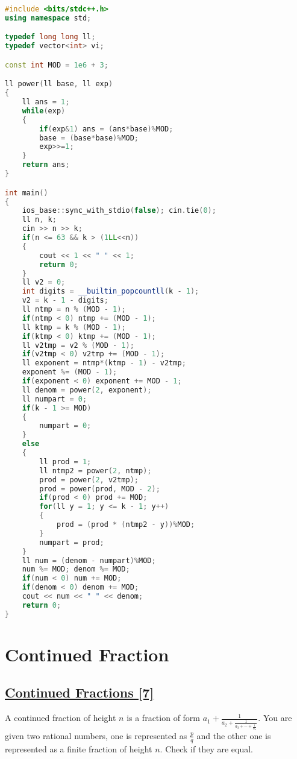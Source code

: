 \documentclass[10pt,a4paper]{article}
\begin{document}
\begin{itemize}
\begin{lstlisting}[language=C++, caption={Zeus and The Birthday Paradox},label={1st:code}, mathescape=true, breaklines=true]
#include <bits/stdc++.h>
using namespace std;

typedef long long ll;
typedef vector<int> vi;

const int MOD = 1e6 + 3;

ll power(ll base, ll exp)
{
	ll ans = 1;
    while(exp)
    {
		if(exp&1) ans = (ans*base)%MOD;
		base = (base*base)%MOD;
		exp>>=1;
	}
    return ans;
}

int main()
{
	ios_base::sync_with_stdio(false); cin.tie(0);
	ll n, k;
	cin >> n >> k;
	if(n <= 63 && k > (1LL<<n))
	{
		cout << 1 << " " << 1;
		return 0;
	}
	ll v2 = 0;
	int digits = __builtin_popcountll(k - 1);
	v2 = k - 1 - digits;
	ll ntmp = n % (MOD - 1);
	if(ntmp < 0) ntmp += (MOD - 1);
	ll ktmp = k % (MOD - 1);
	if(ktmp < 0) ktmp += (MOD - 1);
	ll v2tmp = v2 % (MOD - 1);
	if(v2tmp < 0) v2tmp += (MOD - 1);
	ll exponent = ntmp*(ktmp - 1) - v2tmp;
	exponent %= (MOD - 1);
	if(exponent < 0) exponent += MOD - 1;
	ll denom = power(2, exponent);
	ll numpart = 0;
	if(k - 1 >= MOD)
	{
		numpart = 0;
	}
	else
	{
		ll prod = 1;
		ll ntmp2 = power(2, ntmp);
		prod = power(2, v2tmp);
		prod = power(prod, MOD - 2);
		if(prod < 0) prod += MOD;
		for(ll y = 1; y <= k - 1; y++)
		{
			prod = (prod * (ntmp2 - y))%MOD;
		}
		numpart = prod;
	}
	ll num = (denom - numpart)%MOD;
	num %= MOD; denom %= MOD;
	if(num < 0) num += MOD;
	if(denom < 0) denom += MOD;
	cout << num << " " << denom;
	return 0;
}
\end{lstlisting}

\section{Continued Fraction}
\subsection*{\href{https://codeforces.com/contest/305/problem/B}{\underline{Continued Fractions [7]}}}

A continued fraction of height $n$ is a fraction of form $a_1 + \frac{1}{a_2 + \frac{1}{a_3 + \cdots + \frac{1}{a_n}}}$. You are given two rational numbers, one is represented as $\frac{p}{q}$ and the other one is represented as a finite fraction of height $n$. Check if they are equal.


\end{itemize}
\end{document}
